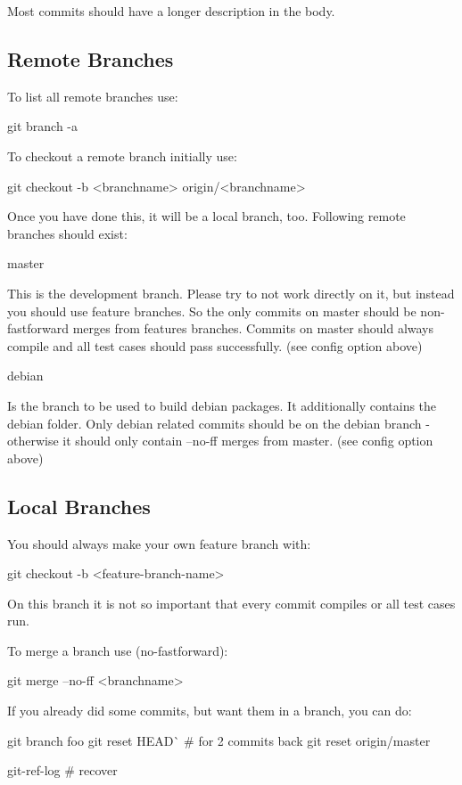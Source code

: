 Most commits should have a longer description in the body.

\subsection*{Remote Branches}

To list all remote branches use\+:


\begin{DoxyCode}
git branch -a
\end{DoxyCode}


To checkout a remote branch initially use\+:


\begin{DoxyCode}
git checkout -b <branchname> origin/<branchname>
\end{DoxyCode}


Once you have done this, it will be a local branch, too. Following remote branches should exist\+: \begin{DoxyVerb}master
\end{DoxyVerb}


This is the development branch. Please try to not work directly on it, but instead you should use feature branches. So the only commits on master should be non-\/fastforward merges from features branches. Commits on master should always compile and all test cases should pass successfully. (see config option above) \begin{DoxyVerb}debian
\end{DoxyVerb}


Is the branch to be used to build debian packages. It additionally contains the debian folder. Only debian related commits should be on the debian branch -\/ otherwise it should only contain --no-\/ff merges from master. (see config option above)

\subsection*{Local Branches}

You should always make your own feature branch with\+:


\begin{DoxyCode}
git checkout -b <feature-branch-name>
\end{DoxyCode}


On this branch it is not so important that every commit compiles or all test cases run.

To merge a branch use (no-\/fastforward)\+:


\begin{DoxyCode}
git merge --no-ff <branchname>
\end{DoxyCode}


If you already did some commits, but want them in a branch, you can do\+:


\begin{DoxyCode}
git branch foo
git reset HEAD^^  # for 2 commits back
git reset origin/master

git-ref-log # recover
\end{DoxyCode}
 